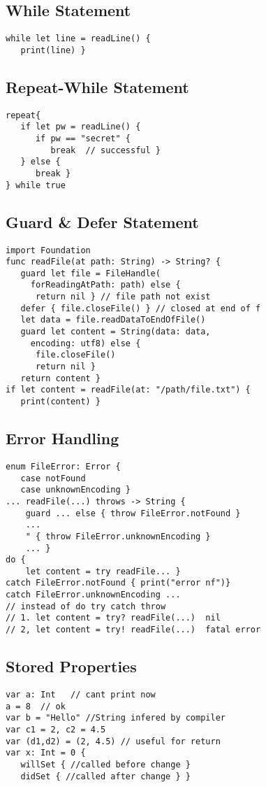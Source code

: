 \subsection{While Statement}
\begin{lstlisting}
while let line = readLine() {
   print(line) }
\end{lstlisting}

\subsection{Repeat-While Statement}
\begin{lstlisting}
repeat{
   if let pw = readLine() {
      if pw == "secret" {
         break  // successful }
   } else {
      break }
} while true
\end{lstlisting}

\subsection{Guard \& Defer Statement}
\begin{lstlisting}
import Foundation
func readFile(at path: String) -> String? {
   guard let file = FileHandle(
     forReadingAtPath: path) else {
      return nil } // file path not exist
   defer { file.closeFile() } // closed at end of f
   let data = file.readDataToEndOfFile()
   guard let content = String(data: data,
     encoding: utf8) else {
      file.closeFile()
      return nil }
   return content }
if let content = readFile(at: "/path/file.txt") {
   print(content) }
\end{lstlisting}

\subsection{Error Handling}
\begin{lstlisting}
enum FileError: Error {
   case notFound
   case unknownEncoding }
... readFile(...) throws -> String {
	guard ... else { throw FileError.notFound }
	...
	" { throw FileError.unknownEncoding }
	... }
do {
	let content = try readFile... }
catch FileError.notFound { print("error nf")}
catch FileError.unknownEncoding ...
// instead of do try catch throw
// 1. let content = try? readFile(...)  nil
// 2, let content = try! readFile(...)  fatal error
\end{lstlisting}

\subsection{Stored Properties}
\begin{lstlisting}
var a: Int   // cant print now
a = 8  // ok
var b = "Hello" //String infered by compiler
var c1 = 2, c2 = 4.5
var (d1,d2) = (2, 4.5) // useful for return
var x: Int = 0 {
   willSet { //called before change }
   didSet { //called after change } }
\end{lstlisting}

